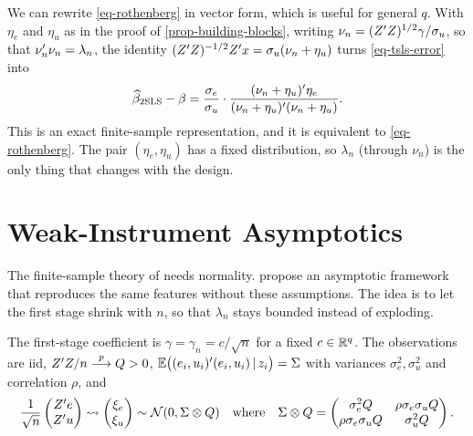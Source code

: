 \documentclass[a4paper,12pt]{article}
\begin{document}
\begin{remark}\label{rmk-vector-form}
	We can rewrite \eqref{eq-rothenberg} in vector form, which is useful for general $q$.
	With $\eta_e$ and $\eta_u$ as in the proof of \autoref{prop-building-blocks},
	writing $\nu_n=(Z^{\prime} Z)^{1/2}\gamma/\sigma_u$, so that $\nu_n^{\prime}\nu_n=\lambda_n$,
	the identity $(Z^{\prime} Z)^{-1/2}Z^{\prime} x=\sigma_u(\nu_n+\eta_u)$ turns \eqref{eq-tsls-error} into
	\begin{align}\label{eq-rothenberg-vector}
		\widehat\beta_{\mathrm{2SLS}}-\beta
		=\frac{\sigma_e}{\sigma_u}\cdot
		\frac{(\nu_n+\eta_u)^{\prime}\eta_e}{(\nu_n+\eta_u)^{\prime}(\nu_n+\eta_u)}.
	\end{align}
	This is an exact finite-sample representation, and it is equivalent to \eqref{eq-rothenberg}.
	The pair $(\eta_e,\eta_u)$ has a fixed distribution, so $\lambda_n$ (through $\nu_n$) is the only thing that changes with the design.
\end{remark}

\section{Weak-Instrument Asymptotics}

The finite-sample theory of \textcite{rothenberg-1984} needs normality.
\textcite{staiger-stock-1997} propose an asymptotic framework that reproduces the same features without these assumptions.
The idea is to let the first stage shrink with $n$, so that $\lambda_n$ stays bounded instead of exploding.

\begin{assumption}\label{ass-weak}
	The first-stage coefficient is $\gamma=\gamma_n=c/\sqrt n$ for a fixed $c\in\mathbb{R}^q$.
	The observations are \gls{iid}, $Z^{\prime} Z/n\overset{p}{\longrightarrow} Q>0$,
	$\operatorname{\mathbb{E}}\bigl((e_i,u_i)^{\prime}(e_i,u_i)\mathpunct{}|\mathpunct{} z_i\bigr)=\Sigma$ with variances $\sigma_e^2,\sigma_u^2$ and correlation $\rho$,
	and
	\begin{align*}
		\frac{1}{\sqrt n}\begin{pmatrix}Z^{\prime} e\\Z^{\prime} u\end{pmatrix}
		\overset{}{\leadsto}
		\begin{pmatrix}\xi_e\\\xi_u\end{pmatrix}
		\sim\operatorname{\mathcal{N}}(0,\Sigma\otimes Q)
		\quad\text{where}\quad
		\Sigma\otimes Q=
		\begin{pmatrix}
			\sigma_e^2 Q & \rho\sigma_e\sigma_u Q\\
			\rho\sigma_e\sigma_u Q & \sigma_u^2 Q
		\end{pmatrix}.
	\end{align*}
\end{assumption}
\end{document}
